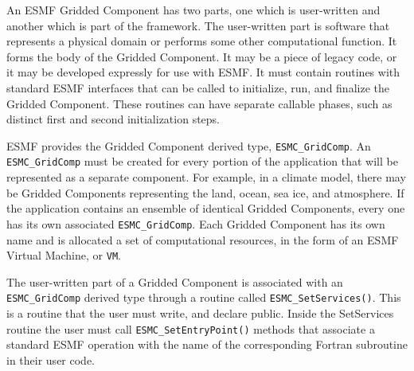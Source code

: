 An ESMF Gridded Component has two parts, one which is user-written
and another which is part of the framework.  The user-written
part is software that represents a physical domain or performs some
other computational function.  It forms the body of the Gridded 
Component.  It may be a piece of legacy code, or it may be developed 
expressly for use with ESMF.  It must contain routines with
standard ESMF interfaces that can be called to initialize, run, and
finalize the Gridded Component.  These routines can have separate 
callable phases, such as distinct first and second initialization steps.

ESMF provides the Gridded Component derived type, 
{\tt ESMC\_GridComp}.  An {\tt ESMC\_GridComp} must be created 
for every portion of the application that will be represented 
as a separate component.  For example, in a climate model, there may 
be Gridded Components representing the land, ocean, sea ice, and 
atmosphere.  If the application contains an ensemble of identical 
Gridded Components, every one has its own associated {\tt ESMC\_GridComp}.
Each Gridded Component has its own name and is allocated
a set of computational resources, in the form of an ESMF Virtual
Machine, or {\tt VM}.

The user-written part of a Gridded Component is associated with an
{\tt ESMC\_GridComp} derived type through a routine called 
{\tt ESMC\_SetServices()}.
This is a routine that the user must write, and declare public.
Inside the SetServices routine the user must call  
{\tt ESMC\_SetEntryPoint()} methods that associate a standard ESMF 
operation with the name of the corresponding Fortran subroutine 
in their user code.
